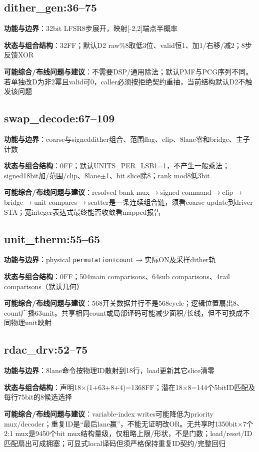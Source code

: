 \documentclass[UTF8,fontset=fandol,10pt,a4paper,openany]{ctexrep}
\newcommand{\code}[1]{\nolinkurl{#1}}
\begin{document}
\subsection*{dither\_gen:36–75}
\noindent\textbf{功能与边界}：32bit LFSR8步展开，映射[-2,2]端点半概率\par
\noindent\textbf{状态与组合结构}：32FF；默认D2 raw\%8取低3位、valid恒1、加1/右移/减2；8步反馈XOR\par
\noindent\textbf{可能综合/布线问题与建议}：不需要DSP/通用除法；默认PMF与PCG序列不同。若单独改D为非2幂且valid可0，caller必须按拒绝契约重抽，当前结构默认D2不触发该问题\par
\subsection*{swap\_decode:67–109}
\noindent\textbf{功能与边界}：coarse与signeddither组合、范围flag、clip、8lane零和bridge、主子计数\par
\noindent\textbf{状态与组合结构}：0FF；默认UNITS\_PER\_LSB1=1，不产生一般乘法；signed18bit加/范围/clip、8lane\ensuremath{\pm}1、bit slice除8；rank mod8低3bit\par
\noindent\textbf{可能综合/布线问题与建议}：resolved bank mux\ensuremath{\rightarrow}signed command\ensuremath{\rightarrow}clip\ensuremath{\rightarrow}bridge\ensuremath{\rightarrow}unit compares\ensuremath{\rightarrow}scatter是一条连续组合链，须看coarse-update到driver STA；宽integer表达式最终能否收敛看mapped报告\par
\subsection*{unit\_therm:55–65}
\noindent\textbf{功能与边界}：physical \code{permutation+count}\ensuremath{\rightarrow}实际ON及采样dither轨\par
\noindent\textbf{状态与组合结构}：0FF；504main comparisons、64sub comparisons、4rail comparisons（默认几何）\par
\noindent\textbf{可能综合/布线问题与建议}：568开关数据并行不是568cycle；逻辑位置扇出8、count广播63unit。共享相同count或局部译码可能减少面积/长线，但不可换成不同物理unit映射\par
\subsection*{rdac\_drv:52–75}
\noindent\textbf{功能与边界}：8lane命令按物理ID散射到18行，load更新其它slice清零\par
\noindent\textbf{状态与组合结构}：声明18\ensuremath{\times}(1+63+8+4)=1368FF；潜在18\ensuremath{\times}8=144个5bitID匹配及每行75bit的8候选选择\par
\noindent\textbf{可能综合/布线问题与建议}：variable-index writes可能降低为priority mux/decoder；重复ID是“最后lane赢”，不能无证明改OR。无共享时1350bit\ensuremath{\times}7个2:1 mux是9450个bit mux结构量级，仅粗略上限/形状，不是门数；load/reset/ID匹配扇出可成拥塞；可显式local译码但须严格保持重复ID契约/完整回归\par
\end{document}
